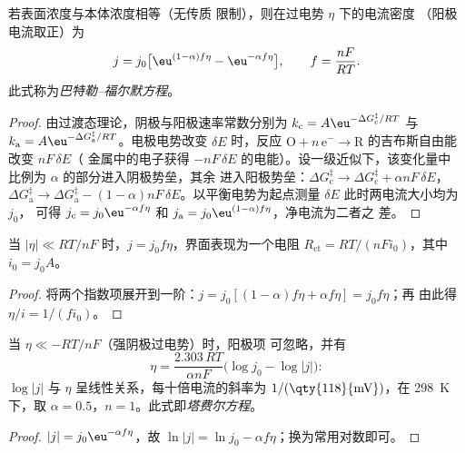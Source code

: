 \begin{theorem}\label{thm:b3:electrode-kinetics:butler-volmer}
若表面浓度与本体浓度相等（无传质
限制），则在过电势 $\eta$ 下的电流密度
（阳极电流取正）为
\[
  j = j_0\bigl[\eu^{(1 - \alpha)f\eta} - \eu^{-\alpha f\eta}\bigr], \qquad f = \frac{nF}{RT}.
\]
此式称为\emph{巴特勒–福尔默方程}。
\end{theorem}

\begin{proof}
由过渡态理论，阴极与阳极速率常数分别为
$k_{\mathrm c} = A\eu^{-\Delta G_{\mathrm c}^{\ddagger}/RT}$ 与 $k_{\mathrm a} = A\eu^{-\Delta G_{\mathrm a}^{\ddagger}/RT}$。电极电势改变 $\delta E$
时，反应 $\mathrm{O} + n\,\mathrm{e}^- \to \mathrm{R}$ 的吉布斯自由能改变 $nF\,\delta E$（
金属中的电子获得 $-nF\,\delta E$ 的电能）。设一级近似下，该变化量中
比例为 $\alpha$ 的部分进入阴极势垒，其余
进入阳极势垒：$\Delta G_{\mathrm c}^{\ddagger} \to \Delta G_{\mathrm c}^{\ddagger} + \alpha nF\,\delta E$，$\Delta G_{\mathrm a}^{\ddagger} \to \Delta G_{\mathrm a}^{\ddagger} - (1 - \alpha)nF\,\delta E$。以平衡电势为起点测量 $\delta E$
此时两电流大小均为 $j_0$，
可得 $j_{\mathrm c} = j_0\eu^{-\alpha f\eta}$ 和 $j_{\mathrm a} = j_0\eu^{(1 - \alpha)f\eta}$，净电流为二者之
差。
\end{proof}

\begin{corollary}[电荷转移电阻]\label{cor:b3:electrode-kinetics:linear}
当 $|\eta| \ll RT/nF$ 时，$j = j_0f\eta$，界面表现为一个电阻
$R_{\mathrm{ct}} = RT/(nFi_0)$，其中 $i_0 = j_0A$。
\end{corollary}

\begin{proof}
将两个指数项展开到一阶：$j = j_0[(1 - \alpha)f\eta + \alpha f\eta] = j_0f\eta$；再
由此得 $\eta/i = 1/(fi_0)$。
\end{proof}

\begin{corollary}[塔费尔方程]\label{cor:b3:electrode-kinetics:tafel}
当 $\eta \ll -RT/nF$（强阴极过电势）时，阳极项
可忽略，并有
\[
  \eta = \frac{2.303\,RT}{\alpha nF}\bigl(\log j_0 - \log|j|\bigr):
\]
$\log|j|$ 与 $\eta$ 呈线性关系，每十倍电流的斜率为 $1/(\text{\qty{118}{mV}})$，在 \qty{298}{K} 下，取 $\alpha = 0.5$，$n =
1$。此式即\emph{塔费尔方程}。
\end{corollary}

\begin{proof}
$|j| = j_0\eu^{-\alpha f\eta}$，故 $\ln|j| = \ln j_0 - \alpha f\eta$；换为常用对数即可。
\end{proof}

